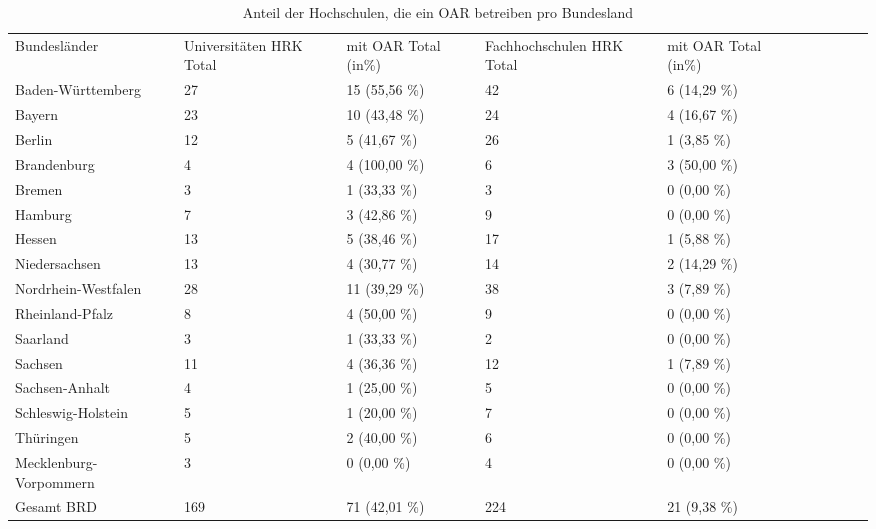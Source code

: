 \documentclass[a4paper,
fontsize=11pt,
oneside,
numbers=noperiodatend,
parskip=half-,
bibliography=totoc,
final
]{scrartcl}
\begin{document}
\begin{table}[ht]
\small
\centering
\begin{tabular}{p{4cm}p{2.5cm}p{2.5cm}p{2.5cm}p{2.5cm} lrrrr}
  \toprule
  Bundesländer & Universitäten HRK Total  & mit OAR Total (in\%)  & Fachhochschulen HRK Total  & mit OAR Total (in\%) \\ 
\cmidrule(r){1-1} \cmidrule(r){2-2} \cmidrule(r){3-3} \cmidrule(r){4-4} \cmidrule(r){5-5}
  Baden-Württemberg &  27 & 15 (55,56 \%) &  42 & 6 (14,29 \%) \\ 
  Bayern &  23 & 10 (43,48 \%) &  24 & 4 (16,67 \%) \\ 
  Berlin &  12 & 5 (41,67 \%) &  26 & 1 (3,85 \%) \\ 
  Brandenburg &   4 & 4 (100,00 \%) &   6 & 3 (50,00 \%) \\ 
  Bremen &   3 & 1 (33,33 \%) &   3 & 0 (0,00 \%) \\ 
  Hamburg &   7 & 3 (42,86 \%) &   9 & 0 (0,00 \%) \\ 
  Hessen &  13 & 5 (38,46 \%) &  17 & 1 (5,88 \%) \\ 
  Niedersachsen &  13 & 4 (30,77 \%) &  14 & 2 (14,29 \%) \\ 
  Nordrhein-Westfalen &  28 & 11 (39,29 \%) &  38 & 3 (7,89 \%) \\ 
  Rheinland-Pfalz &   8 & 4 (50,00 \%) &   9 & 0 (0,00 \%) \\ 
  Saarland &   3 & 1 (33,33 \%) &   2 & 0 (0,00 \%) \\ 
  Sachsen &  11 & 4 (36,36 \%) &  12 & 1 (7,89 \%) \\ 
  Sachsen-Anhalt &   4 & 1 (25,00 \%) &   5 & 0 (0,00 \%) \\ 
  Schleswig-Holstein &   5 & 1 (20,00 \%) &   7 & 0 (0,00 \%) \\ 
  Thüringen &   5 & 2 (40,00 \%) &   6 & 0 (0,00 \%) \\ 
  Mecklenburg-Vorpommern &   3 & 0 (0,00 \%) &   4 & 0 (0,00 \%) \\
  \cmidrule(r){1-1} \cmidrule(r){2-2} \cmidrule(r){3-3} \cmidrule(r){4-4} \cmidrule(r){5-5} 
  Gesamt BRD & 169 & 71 (42,01 \%) & 224 & 21 (9,38 \%) \\ 
   \bottomrule
\end{tabular}
\caption{Anteil der Hochschulen, die ein OAR betreiben pro Bundesland}
\end{table}
\end{document}
